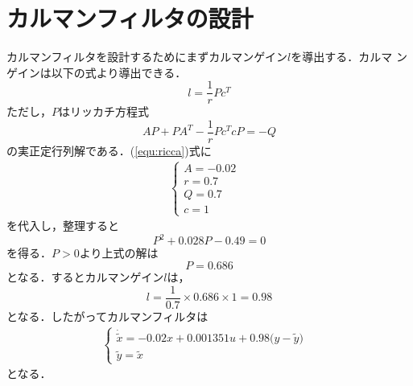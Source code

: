 \documentclass[a4paper,12pt]{jarticle}
\begin{document}
\section{カルマンフィルタの設計}
カルマンフィルタを設計するためにまずカルマンゲイン$l$を導出する．カルマ
ンゲインは以下の式より導出できる．
\begin{equation}\label{equ:gain}
 l = \frac{1}{r}Pc^T
\end{equation}
ただし，$P$はリッカチ方程式
\begin{equation}\label{equ:ricca}
 AP + PA^T -\frac{1}{r}Pc^TcP = -Q 
\end{equation}
の実正定行列解である．(\ref{equ:ricca})式に
\begin{eqnarray}
 \begin{cases}
  A = -0.02 & \\
  r = 0.7 & \\
  Q = 0.7 & \\
  c = 1
 \end{cases}
\end{eqnarray}
を代入し，整理すると
\begin{equation}
 P^2 + 0.028P -0.49 = 0
\end{equation}
を得る．$P > 0$より上式の解は
\begin{equation}
 P = 0.686
\end{equation}
となる．するとカルマンゲイン$l$は，
\begin{equation}
 l = \frac{1}{0.7} \times 0.686 \times 1 = 0.98
\end{equation}
となる．したがってカルマンフィルタは
\begin{eqnarray}
 \begin{cases}
\dot{\tilde{x}} = -0.02x + 0.001351u + 0.98 \big(y - \tilde{y} \big)
  & \\
  \tilde{y} = \tilde{x}
 \end{cases}
\end{eqnarray}
となる．

\end{document}
